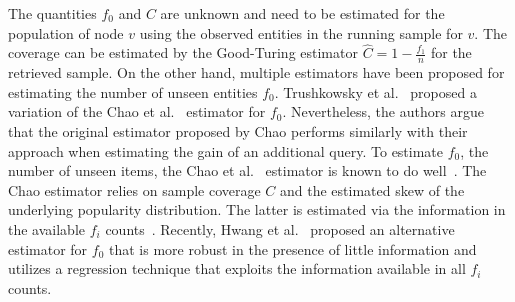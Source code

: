 The quantities $f_0$ and $C$ are unknown and need to be estimated for the population of node $v$ using the observed entities in the running sample for $v$. The coverage can be estimated by the Good-Turing estimator $\hat{C} = 1 - \frac{f_1}{n}$ for the retrieved sample. 
 \iftr
On the other hand, multiple estimators have been proposed for estimating the number of unseen entities $f_0$.
Trushkowsky et al.~\cite{trushkowsky:2013} proposed a variation of the Chao et al.~\cite{chao:1992} estimator for $f_0$. Nevertheless, the authors argue that the original estimator proposed by Chao performs similarly with their approach when estimating the gain of an additional query. 
\fi
\ifpaper
To estimate $f_0$, the number of unseen items, the Chao et al.~\cite{chao:1992} estimator is known to do well~\cite{DBLP:journals/cacm/TrushkowskyKS16,trushkowsky:2013}.
\fi
The Chao estimator relies on sample coverage $C$ and the estimated skew of the underlying popularity distribution. The latter is estimated via the information in the available $f_i$ counts~\cite{chao:1992}. Recently, Hwang et al.~\cite{hwang:2010} proposed an alternative estimator for $f_0$ that is more robust in the presence of little information and utilizes a regression technique that exploits the information available in all $f_i$ counts.  

